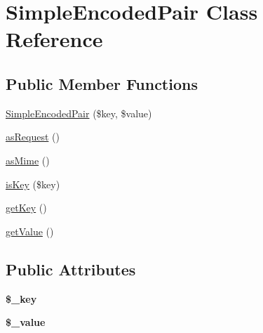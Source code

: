 \hypertarget{class_simple_encoded_pair}{
\section{SimpleEncodedPair Class Reference}
\label{class_simple_encoded_pair}
}
\subsection*{Public Member Functions}
\begin{DoxyCompactItemize}
\item 
\hyperlink{class_simple_encoded_pair_a99be530ce760f7b3ef39fdab4f3e52b1}{SimpleEncodedPair} (\$key, \$value)
\item 
\hyperlink{class_simple_encoded_pair_a8ce3ce6d7a804ee6fcd343397ae8d567}{asRequest} ()
\item 
\hyperlink{class_simple_encoded_pair_a100d7af9df42a304dc7c2d7b21fe48ef}{asMime} ()
\item 
\hyperlink{class_simple_encoded_pair_acf18455c43450b58f3d4c71e455fab8e}{isKey} (\$key)
\item 
\hyperlink{class_simple_encoded_pair_ae28914274d76bc7e6ad9e41595f851e9}{getKey} ()
\item 
\hyperlink{class_simple_encoded_pair_aa4061b82a5741fef9824ddaeb3ccfb9d}{getValue} ()
\end{DoxyCompactItemize}
\subsection*{Public Attributes}
\begin{DoxyCompactItemize}
\item 
\hypertarget{class_simple_encoded_pair_a14fd62be653052bca74972003d95c05a}{
{\bfseries \$\_\-key}}
\label{class_simple_encoded_pair_a14fd62be653052bca74972003d95c05a}

\item 
\hypertarget{class_simple_encoded_pair_a4cfa05b2cf592cb122f5fb15c787f43f}{
{\bfseries \$\_\-value}}
\label{class_simple_encoded_pair_a4cfa05b2cf592cb122f5fb15c787f43f}

\end{DoxyCompactItemize}


